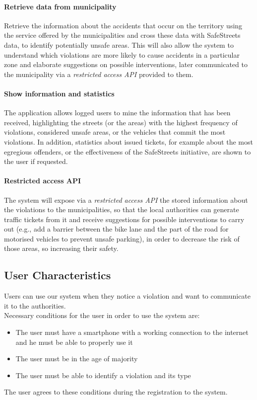 \paragraph{Retrieve data from municipality}
Retrieve the information about the accidents that occur on the territory using the service offered by the municipalities and cross these data with SafeStreets data, to identify potentially unsafe areas. This will also allow the system to understand which violations are more likely to cause accidents in a particular zone and elaborate suggestions on possible interventions, later communicated to the municipality via a \emph{restricted access API} provided to them.

\paragraph{Show information and statistics}
The application allows logged users to mine the information that has been received, highlighting the streets (or the areas) with the highest frequency of violations, considered unsafe areas, or the vehicles that commit the most violations. In addition, statistics about issued tickets, for example about the most egregious offenders, or the effectiveness of the SafeStreets initiative, are shown to the user if requested. 

\paragraph{Restricted access API}
The system will expose via a \emph{restricted access API} the stored information about the violations to the municipalities, so that the local authorities can generate traffic tickets from it and receive suggestions for possible interventions to carry out (e.g., add a barrier between the bike lane and the part of the road for motorised vehicles to prevent unsafe parking), in order to decrease the risk of those areas, so increasing their safety. 



\subsection{User Characteristics}
	Users can use our system when they notice a violation and want to communicate it to the authorities.\\
 	Necessary conditions for the user in order to use the system are:
 	\begin{itemize}
 		\item The user must have a smartphone with a working connection to the internet and he must be able to properly use it
 		\item The user must be in the age of majority
 		\item The user must be able to identify a violation and its type
 	\end{itemize}
 	The user agrees to these conditions during the registration to the system.
 	
